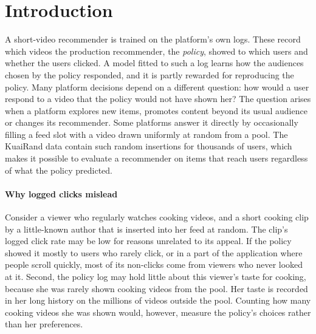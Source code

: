 \section{Introduction}
\label{sec:intro}

A short-video recommender is trained on the platform's own logs. These record which videos the production recommender, the
\emph{policy}, showed to which users and whether the users clicked. A model fitted to such a log learns how the audiences chosen
by the policy responded, and it is partly rewarded for reproducing the policy. Many platform decisions depend on a different
question: how would a user respond to a video that the policy would not have shown her? The question arises when a platform
explores new items, promotes content beyond its usual audience or changes its recommender. Some platforms answer it directly by
occasionally filling a feed slot with a video drawn uniformly at random from a pool. The KuaiRand data \citep{gao2022kuairand}
contain such random insertions for thousands of users, which makes it possible to evaluate a recommender on items that reach
users regardless of what the policy predicted.

\paragraph{Why logged clicks mislead} Consider a viewer who regularly watches cooking videos, and a short cooking clip by a
little-known author that is inserted into her feed at random. The clip's logged click rate may be low for reasons unrelated to
its appeal. If the policy showed it mostly to users who rarely click, or in a part of the application where people scroll quickly,
most of its non-clicks come from viewers who never looked at it. Second, the policy log may hold little about this viewer's taste for
cooking, because she was rarely shown cooking videos from the pool. Her taste is recorded in her long history on the millions of
videos outside the pool. Counting how many cooking videos she was shown would, however, measure the policy's choices rather than
her preferences.

